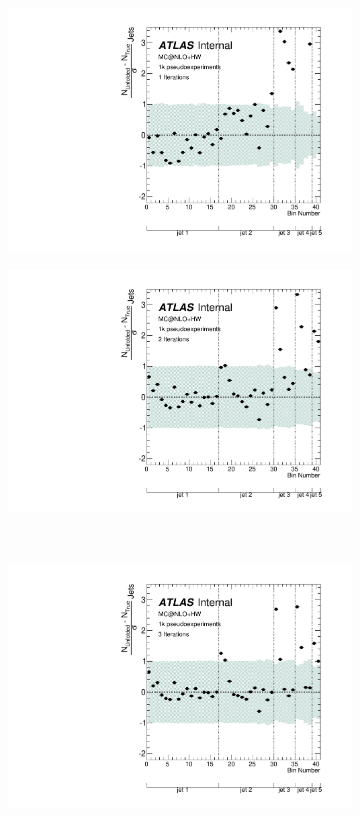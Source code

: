 \clearpage
\begin{figure}
\begin{subfigure}[]{0.5\textwidth}
\includegraphics[width=\textwidth]{fig/Stress/105200atlfast/Pull1Iterations.pdf}
\end{subfigure}
\begin{subfigure}[]{0.5\textwidth}
\includegraphics[width=\textwidth]{fig/Stress/105200atlfast/Pull2Iterations.pdf}
\end{subfigure}
\\
\begin{subfigure}[]{0.5\textwidth}
\includegraphics[width=\textwidth]{fig/Stress/105200atlfast/Pull3Iterations.pdf}

\end{subfigure}
\end{figure}
